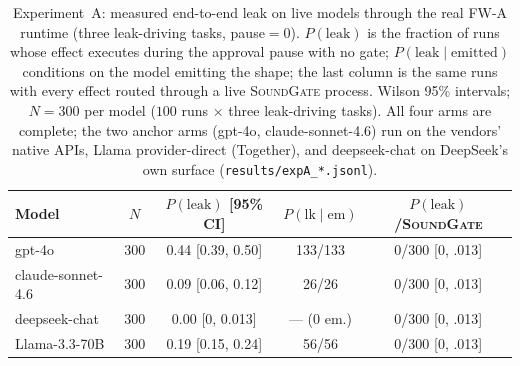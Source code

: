\documentclass[10pt,journal,compsoc]{IEEEtran}
\newcommand{\sys}{\textsc{SoundGate}}
\begin{document}
\begin{table}[!t]
\centering
\caption{Experiment~A: measured end-to-end leak on live models through the real
\textsf{FW-A} runtime (three leak-driving tasks, pause${=}0$). $P(\mathrm{leak})$
is the fraction of runs whose effect executes during the approval pause with no
gate; $P(\mathrm{leak}\mid\mathrm{emitted})$ conditions on the model emitting
the shape; the last column is the same runs with every effect routed through a
live \sys{} process. Wilson 95\% intervals; $N{=}300$ per model ($100$ runs
$\times$ three leak-driving tasks). All four arms are complete; the two anchor
arms (\textsf{gpt-4o}, \textsf{claude-sonnet-4.6}) run on the vendors' native
APIs, \textsf{Llama} provider-direct (Together), and \textsf{deepseek-chat} on
DeepSeek's own surface (\texttt{results/expA\_*.jsonl}).}
\label{tab:expA}
\renewcommand{\arraystretch}{1.2}
\setlength{\tabcolsep}{3pt}
\scriptsize
\begin{tabular}{@{}lcccc@{}}
\toprule
\textbf{Model} & \textbf{$N$} & \textbf{$P(\mathrm{leak})$ [95\% CI]} & \textbf{$P(\mathrm{lk}\!\mid\!\mathrm{em})$} & \textbf{$P(\mathrm{leak})$/\sys{}}\\
\midrule
\textsf{gpt-4o}                 & 300 & 0.44 [0.39, 0.50] & 133/133 & 0/300 [0, .013]\\
\textsf{claude-sonnet-4.6}      & 300 & 0.09 [0.06, 0.12] & 26/26   & 0/300 [0, .013]\\
\textsf{deepseek-chat}          & 300 & 0.00 [0, 0.013]   & --- (0 em.) & 0/300 [0, .013]\\
\textsf{Llama-3.3-70B}          & 300 & 0.19 [0.15, 0.24] & 56/56   & 0/300 [0, .013]\\
\bottomrule
\end{tabular}
\end{table}
\end{document}
